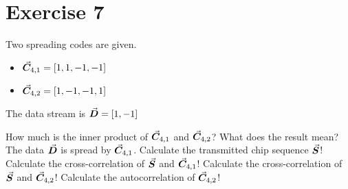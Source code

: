 %
%
%

{}
\section*{Exercise 7}


\begin{question}[subtitle={DS-CDMA}]
	Two spreading codes are given.
	\begin{itemize}
		\item $\vec{\bm{C}}_{4,1} = \left[1,1,-1,-1\right]$
		\item $\vec{\bm{C}}_{4,2} = \left[1,-1,-1,1\right]$
	\end{itemize}

	The data stream is $\vec{\bm{D}} = \left[1,-1\right]$
	
	\begin{tasks}
		\task
		How much is the inner product of $\vec{\bm{C}}_{4,1}$ and $\vec{\bm{C}}_{4,2}$? What does the result mean?
		\task
		The data $\vec{\bm{D}}$ is spread by $\vec{\bm{C}}_{4,1}$. Calculate the transmitted chip sequence $\vec{\bm{S}}$!
		\task
		Calculate the cross-correlation of $\vec{\bm{S}}$ and $\vec{\bm{C}}_{4,1}$!
		\task
		Calculate the cross-correlation of $\vec{\bm{S}}$ and $\vec{\bm{C}}_{4,2}$!
		\task
		Calculate the autocorrelation of $\vec{\bm{C}}_{4,2}$!
	\end{tasks}
\end{question}

